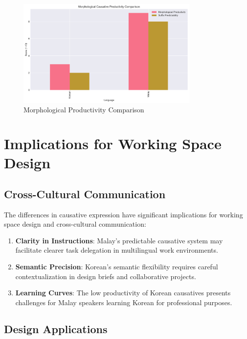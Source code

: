 \documentclass[12pt,a4paper]{article}
\begin{document}
\begin{figure}[h]
\centering
\includegraphics[width=0.8\textwidth]{../analysis/productivity_comparison.png}
\caption{Morphological Productivity Comparison}
\end{figure}

\section{Implications for Working Space Design}

\subsection{Cross-Cultural Communication}

The differences in causative expression have significant implications for working space design and cross-cultural communication:

\begin{enumerate}
\item \textbf{Clarity in Instructions}: Malay's predictable causative system may facilitate clearer task delegation in multilingual work environments.

\item \textbf{Semantic Precision}: Korean's semantic flexibility requires careful contextualization in design briefs and collaborative projects.

\item \textbf{Learning Curves}: The low productivity of Korean causatives presents challenges for Malay speakers learning Korean for professional purposes.
\end{enumerate}

\subsection{Design Applications}
\end{document}
